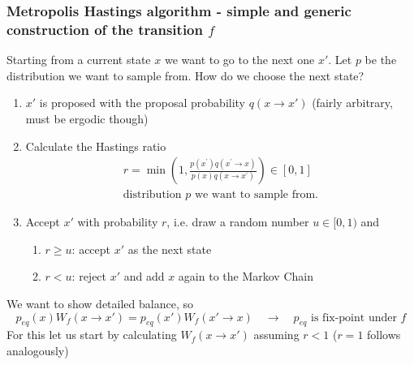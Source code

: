 \subsubsection{Metropolis Hastings algorithm - simple and generic construction of the transition $f$}
Starting from a current state $x$ we want to go to the next one $x'$. Let $p$ be the distribution we want to sample from. How do we choose the next state?
\begin{enumerate}
    \item $x'$ is proposed with the proposal probability $q(x\rightarrow x')$ (fairly arbitrary, must be ergodic though)
    \item Calculate the Hastings ratio
    \begin{equation}
        \begin{gathered}
            r=\min \left(1, \frac{p\left(x^{\prime}\right) q\left(x^{\prime} \rightarrow x\right)}{p(x) q\left(x \rightarrow x^{\prime}\right)}\right) \in[0,1] \\
            \text{distribution } p \text{ we want to sample from.}
        \end{gathered}
    \end{equation}
    \item Accept $x'$ with probability $r$, i.e. draw a random number $u \in [0,1)$ and
    \begin{enumerate}
        \item $r\geq u$: accept $x'$ as the next state
        \item $r<u$: reject $x'$ and add $x$ again to the Markov Chain
    \end{enumerate}
\end{enumerate}

We want to show detailed balance, so
\begin{equation}
    p_{eq}(x) W_f(x\rightarrow x') = p_{eq}(x') W_f(x'\rightarrow x) \quad \rightarrow \quad p_{eq} \text{ is fix-point under } f
\end{equation}
For this let us start by calculating $W_f(x \rightarrow x')$ assuming $r<1$
($r = 1$ follows analogously)

